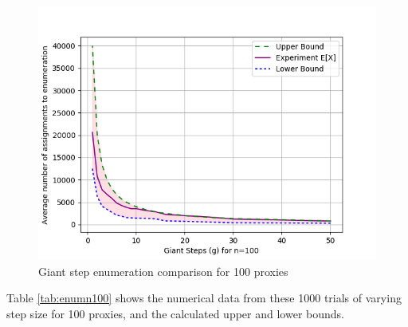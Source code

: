 \begin{figure}[h!]
\centering
     \includegraphics[width=1.0\textwidth]{fig/needle_expected_value_n_100.png}
    \caption{Giant step enumeration comparison for 100 proxies}

    \label{fig:gsn100}
\end{figure}

Table \ref{tab:enumn100} shows the numerical data from these 1000 trials of varying step size for 100 proxies, and the calculated upper and lower bounds.

